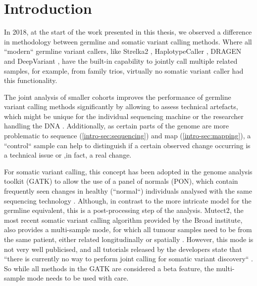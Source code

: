 \section{Introduction}
\label{variantcalling-sec:intro}
In 2018, at the start of the work presented in this thesis, we observed a difference in methodology  between germline and somatic variant calling methods. Where all ``modern`` germline variant callers, like Strelka2 \cite{Kim2018}, HaplotypeCaller \cite{Poplin2017}, DRAGEN \cite{Miller2015} and DeepVariant \cite{Poplin2018},  have the built-in capability to jointly call multiple related samples, for example, from family trios, virtually no somatic variant caller had this functionality. 

The joint analysis of smaller cohorts improves the performance of germline variant calling methods significantly by allowing to assess technical artefacts, which might be unique for the individual sequencing machine or the researcher handling the DNA \cite{Schirmer2016,Stoler2021}. Additionally, as certain parts of the genome are more problematic to sequence (\autoref{intro-sec:sequencing}) and map (\autoref{intro-sec:mapping}), a ``control`` sample can help to distinguish if a certain observed change  occurring  is a technical issue or ,in fact, a real change.

For somatic variant calling, this concept has been adopted  in the genome analysis toolkit (GATK) \cite{BrianOConnor2020} to allow the use of a panel of normals (PON), which contain frequently seen changes in healthy (``normal``) individuals analysed with the same sequencing technology \cite{GATKTeam2021}. Although, in contrast to the  more intricate model for the germline equivalent, this is a post-processing step of the analysis. Mutect2,  the most recent somatic variant calling algorithm provided by the Broad institute, also provides a multi-sample mode, for which all tumour samples need to be from the same patient, either related longitudinally or spatially \cite{GATKTeam2020}. However, this mode is not very well publicised, and all tutorials released by the developers state that ``there is currently no way to perform joint calling for somatic variant discovery`` \cite{GATKTeam2021a}. So while all methods in the GATK are considered a beta feature, the multi-sample mode needs to be used with care.

